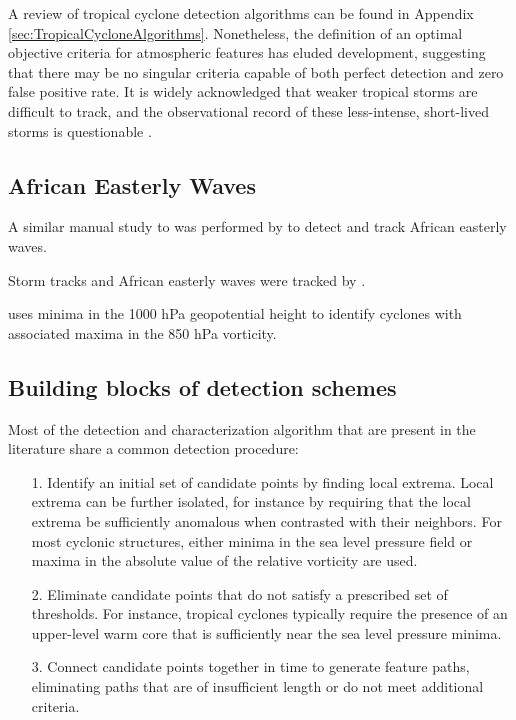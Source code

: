 \documentclass[gmdd, hvmath, online]{copernicus_discussions}
\begin{document}
A review of tropical cyclone detection algorithms can be found in Appendix \ref{sec:TropicalCycloneAlgorithms}.  Nonetheless, the definition of an optimal objective criteria for atmospheric features has eluded development, suggesting that there may be no singular criteria capable of both perfect detection and zero false positive rate.  It is widely acknowledged that weaker tropical storms are difficult to track, and the observational record of these less-intense, short-lived storms is questionable \citep{Landsea2010}.

\subsection{African Easterly Waves}

A similar manual study to \cite{akyildiz1985systematic} was performed by \cite{reed1988evaluation} to detect and track African easterly waves.

Storm tracks and African easterly waves were tracked by \cite{hodges2003comparison}.

\cite{konig1993objective} uses minima in the 1000 hPa geopotential height to identify cyclones with associated maxima in the 850 hPa vorticity.


\subsection{Building blocks of detection schemes}

Most of the detection and characterization algorithm that are present in the literature share a common detection procedure:
\begin{itemize}
\item[1.] Identify an initial set of candidate points by finding local extrema.  Local extrema can be further isolated, for instance by requiring that the local extrema be sufficiently anomalous when contrasted with their neighbors.  For most cyclonic structures, either minima in the sea level pressure field or maxima in the absolute value of the relative vorticity are used.
\item[2.] Eliminate candidate points that do not satisfy a prescribed set of thresholds.  For instance, tropical cyclones typically require the presence of an upper-level warm core that is sufficiently near the sea level pressure minima.
\item[3.] Connect candidate points together in time to generate feature paths, eliminating paths that are of insufficient length or do not meet additional criteria.
\end{itemize}
\end{document}
